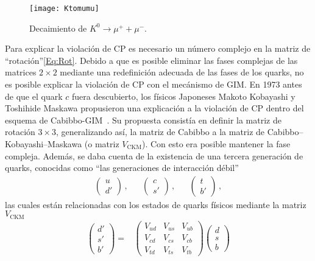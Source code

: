 %
\begin{figure}
\centering
\texttt{[image: Ktomumu]}
\caption{Decaimiento de $K^{0} \to \mu^{+} + \mu^{-}$.}
\label{Fig:Ktomumu}
\end{figure}
%

Para explicar la violación de CP es necesario un número complejo en la matriz de \textquotedblleft rotación\textquotedblright \eqref{Eq:Rot}. Debido a que es posible eliminar las fases complejas de las matrices $2 \times 2$ mediante una redefinición adecuada de las fases de los quarks, no es posible explicar la violación de CP con el mecánismo de GIM. En 1973 antes de que el quark $c$ fuera descubierto, los físicos Japoneses Makoto Kobayashi y Toshihide Maskawa propusieron una explicación a la violación de CP dentro del esquema de Cabibbo-GIM~\cite{Kobayashi:1973fv}. Su propuesta consistía en definir la matriz de rotación $3 \times 3$, generalizando así, la matriz de Cabibbo a la matriz de Cabibbo–Kobayashi–Maskawa (o matriz $V_{\text{CKM}}$). Con esto era posible mantener la fase compleja. Además, se daba cuenta de la existencia de una tercera generación de quarks, conocidas como \textquotedblleft las generaciones de interacción débil\textquotedblright
%
\begin{align*}
\begin{pmatrix}u \\ d' \end{pmatrix}\,, & 
&\begin{pmatrix}c \\ s' \end{pmatrix}\,, &
&\begin{pmatrix}t \\ b' \end{pmatrix}\,,
\end{align*}
%
las cuales están relacionadas con  los estados de quarks físicos mediante la matriz $V_{\text{CKM}}$
%
\begin{align*}
\begin{pmatrix}d' \\ s' \\ b' \end{pmatrix} =& 
\begin{pmatrix}V_{ud} & V_{us} & V_{ub} \\ V_{cd} & V_{cs} & V_{cb} \\ V_{td} & V_{ts} & V_{tb} \end{pmatrix}
\begin{pmatrix}d \\ s \\ b \end{pmatrix}
\end{align*}
